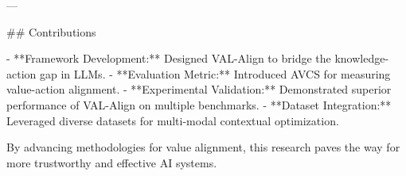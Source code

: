 ---

## Contributions  

- **Framework Development:** Designed VAL-Align to bridge the knowledge-action gap in LLMs.  
- **Evaluation Metric:** Introduced AVCS for measuring value-action alignment.  
- **Experimental Validation:** Demonstrated superior performance of VAL-Align on multiple benchmarks.  
- **Dataset Integration:** Leveraged diverse datasets for multi-modal contextual optimization.  

By advancing methodologies for value alignment, this research paves the way for more trustworthy and effective AI systems.
